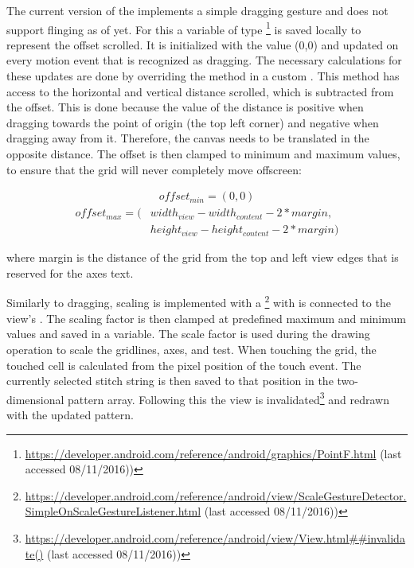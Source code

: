 The current version of the  implements a simple dragging gesture and does not support flinging as of yet. For this a variable of type \footnote{\url{https://developer.android.com/reference/android/graphics/PointF.html} (last accessed 08/11/2016))} is saved locally to represent the offset scrolled. It is initialized with the value (0,0) and updated on every motion event that is recognized as dragging. The necessary calculations for these updates are done by overriding the  method in a custom . This method has access to the horizontal and vertical distance scrolled, which is subtracted from the offset. This is done because the value of the distance is positive when dragging towards the point of origin (the top left corner) and negative when dragging away from it. Therefore, the canvas needs to be translated in the opposite distance. The offset is then clamped to minimum and maximum values, to ensure that the grid will never completely move offscreen: 

\begin{gather*}
offset_{min} = (0, 0)
\end{gather*}
\begin{align*}
offset_{max} = (&width_{view} - width_{content} - 2 * margin, \\
				&height_{view} - height_{content} - 2 * margin)
\end{align*}

where margin is the distance of the grid from the top and left view edges that is reserved for the axes text.

Similarly to dragging, scaling is implemented with a \footnote{\url{https://developer.android.com/reference/android/view/ScaleGestureDetector.SimpleOnScaleGestureListener.html} (last accessed 08/11/2016))} with is connected to the view's . The scaling factor is then clamped at predefined maximum and minimum values and saved in a variable. The scale factor is used during the drawing operation to scale the gridlines, axes, and test. When touching the grid, the touched cell is calculated from the pixel position of the touch event. The currently selected stitch string is then saved to that position in the two-dimensional pattern array. Following this the view is invalidated\footnote{\url{https://developer.android.com/reference/android/view/View.html##invalidate()} (last accessed 08/11/2016))} and redrawn with the updated pattern.   

